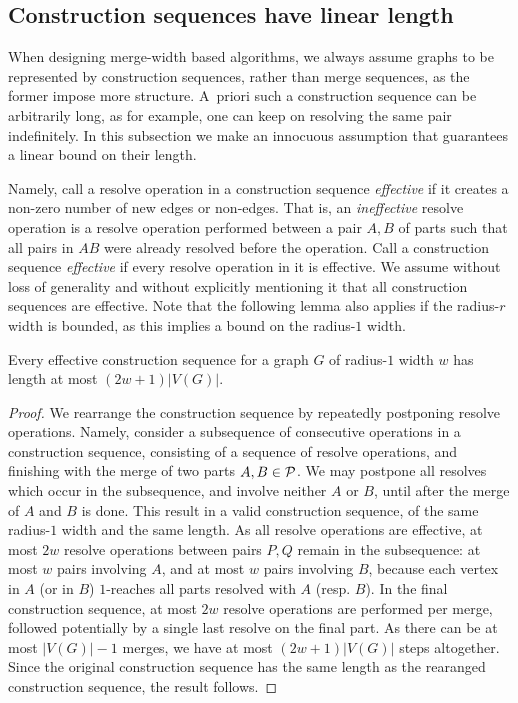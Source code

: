   





  
\subsection{Construction sequences have linear length}\label{sec:representing}

When designing merge-width based algorithms,
we always assume graphs to be represented by construction sequences, rather than merge sequences,
as the former impose more structure.
A~priori such a construction sequence can be arbitrarily long, as for example, one can keep on resolving the same pair indefinitely.
In this subsection we make an innocuous assumption that guarantees a linear bound on their length.


Namely, call a resolve operation in a construction sequence 
\emph{effective} if it creates a non-zero number of new edges or non-edges. 
That is, an \emph{ineffective} resolve operation 
is a resolve operation performed between a pair $A,B$ of parts 
such that all pairs in $AB$ were already resolved before the operation.
Call a construction sequence \emph{effective} if 
every resolve operation in it is effective.
We assume without loss of generality and without explicitly mentioning it that all construction sequences are effective.
Note that the following lemma also applies if the radius-\(r\) width is bounded, as this implies a bound on the radius-\(1\) width.

\begin{lemma}\label{lem:effective-construction-seq}
  Every effective construction sequence for a graph $G$ of radius-$1$ width $w$ has length at most $(2w+1)|V(G)|$.
\end{lemma}
\begin{proof}
  We rearrange the construction sequence by repeatedly postponing resolve operations.
  Namely, consider a subsequence of consecutive operations in a construction sequence,
  consisting of a sequence of resolve operations, and finishing with the merge
  of two parts $A,B\in\cal P$. We may postpone all resolves which occur in the subsequence, and involve 
  neither $A$ or $B$, until after the merge of $A$ and $B$ is done.
  This result in a valid construction sequence,
  of the same radius-$1$ width and the same length.
  As all resolve operations are effective,
  at most $2w$ resolve operations between pairs $P,Q$ remain in the subsequence: at most $w$ pairs involving $A$, and at most $w$ pairs involving $B$, because each vertex in $A$ (or in $B$) $1$-reaches all parts resolved with $A$ (resp. $B$). 
  In the final construction sequence, at most $2w$ resolve operations are performed per merge,
  followed potentially by a single last resolve on the final part.
  As there can be at most \(|V(G)|-1\) merges, we have at most $(2w+1)|V(G)|$ steps altogether.
  Since the original construction sequence has the same length as the rearanged construction sequence, the result follows.
\end{proof}



  





  
